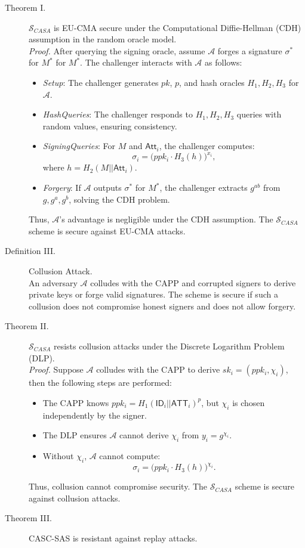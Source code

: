 \begin{description}
    \item[Theorem I.] $\mathcal{S}_{CASA}$ is EU-CMA secure under the Computational Diffie-Hellman (CDH) assumption in the random oracle model.\\
    \textit{Proof.} After querying the signing oracle, assume $\mathcal{A}$ forges a signature $\sigma^*$ for $M^*$ for $ M^*$. The challenger interacts with $\mathcal{A}$ as follows:
    \begin{itemize}
        \item \textit{Setup}: The challenger generates $pk$, $p$, and hash oracles \( H_1, H_2, H_3 \) for \( \mathcal{A} \).
        \item \textit{HashQueries}: The challenger responds to \( H_1, H_2, H_3 \) queries with random values, ensuring consistency.
        \item \textit{SigningQueries}: For $M$ and $\mathsf{Att}_{i}$, the challenger computes:
        \[
        \sigma_i = \big(ppk_{i} \cdot H_3(h)\big)^{x_i},
        \]
        where $h = H_2(M || \mathsf{Att}_{i})$.
        \item \textit{Forgery}: If \( \mathcal{A} \) outputs \( \sigma^* \) for \( M^* \), the challenger extracts \( g^{ab} \) from \( g, g^a, g^b \), solving the CDH problem.
    \end{itemize}
    Thus, $\mathcal{A}$'s advantage is negligible under the CDH assumption. The $\mathcal{S}_{CASA}$ scheme is secure against EU-CMA attacks.

    \item[Definition III.] Collusion Attack.\\
    An adversary $\mathcal{A}$ colludes with the CAPP and corrupted signers to derive private keys or forge valid signatures.
    The scheme is secure if such a collusion does not compromise honest signers and does not allow forgery.

    \item[Theorem II.] $\mathcal{S}_{CASA}$ resists collusion attacks under the Discrete Logarithm Problem (DLP).\\
    \textit{Proof.} Suppose $\mathcal{A}$ colludes with the CAPP to derive $sk_i = (ppk_i, \chi_i)$, then the following steps are performed:
    \begin{itemize}
        \item The CAPP knows $ppk_i = H_1(\mathsf{ID}_i || \mathsf{ATT}_i)^{p}$, but $\chi_i$ is chosen independently by the signer.
        \item The DLP ensures $\mathcal{A}$ cannot derive $\chi_i$ from $y_i = g^{\chi_i}$.
        \item Without $\chi_i$, $\mathcal{A}$ cannot compute:
        \[
        \sigma_i = \big(ppk_i \cdot H_3(h)\big)^{\chi_i}.
        \]
    \end{itemize}
    Thus, collusion cannot compromise security. The $\mathcal{S}_{CASA}$ scheme is secure against collusion attacks.

    \item[Theorem III.] CASC-SAS is resistant against replay attacks.\\
\end{description}

